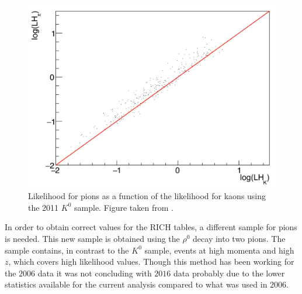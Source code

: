 \begin{figure}[!h]
  \centering
	\includegraphics[scale=0.4]{./gfx/K0sample.png}
	\caption{Likelihood for pions as a function of the likelihood for kaons using the 2011 $K^0$ sample. Figure taken from \cite{RICHnote}.}
	\label{pic:K0sample}
\end{figure}

In order to obtain correct values for the RICH tables, a different sample for pions is needed. This new sample is obtained using the $\rho^0$ decay into two pions. The sample contains, in contrast to the $K^0$ sample, events at high momenta and high $z$, which covers high likelihood values. Though this method has been working for the $2006$ data it was not concluding with $2016$ data probably due to the lower statistics available for the current analysis compared to what was used in $2006$.

